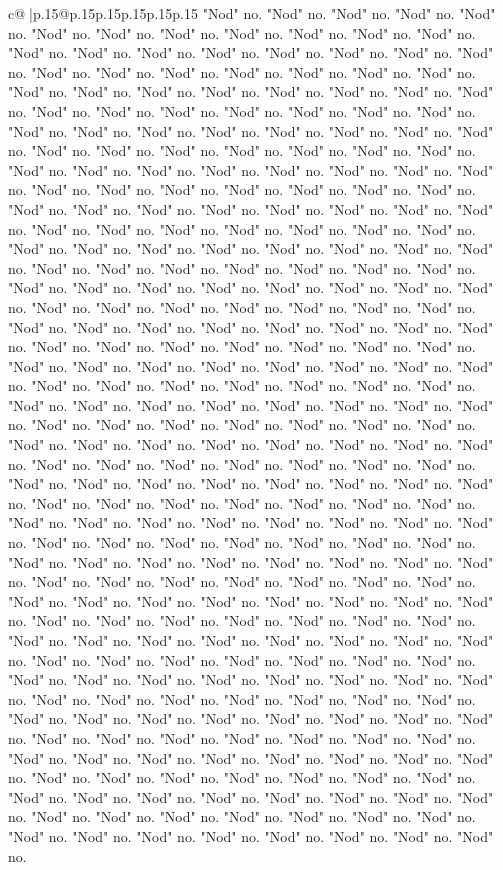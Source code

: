 \documentclass{article}
\begin{document}
{\begin{supertabular}{c@{$\;$}|p{.15\linewidth}@{}p{.15\linewidth}p{.15\linewidth}p{.15\linewidth}p{.15\linewidth}p{.15\linewidth}}
{{{"Nod" no. "Nod" no. "Nod" no. "Nod" no. "Nod" no. "Nod" no. "Nod" no. "Nod" no. "Nod" no. "Nod" no. "Nod" no. "Nod" no. "Nod" no. "Nod" no. "Nod" no. "Nod" no. "Nod" no. "Nod" no. "Nod" no. "Nod" no. "Nod" no. "Nod" no. "Nod" no. "Nod" no. "Nod" no. "Nod" no. "Nod" no. "Nod" no. "Nod" no. "Nod" no. "Nod" no. "Nod" no. "Nod" no. "Nod" no. "Nod" no. "Nod" no. "Nod" no. "Nod" no. "Nod" no. "Nod" no. "Nod" no. "Nod" no. "Nod" no. "Nod" no. "Nod" no. "Nod" no. "Nod" no. "Nod" no. "Nod" no. "Nod" no. "Nod" no. "Nod" no. "Nod" no. "Nod" no. "Nod" no. "Nod" no. "Nod" no. "Nod" no. "Nod" no. "Nod" no. "Nod" no. "Nod" no. "Nod" no. "Nod" no. "Nod" no. "Nod" no. "Nod" no. "Nod" no. "Nod" no. "Nod" no. "Nod" no. "Nod" no. "Nod" no. "Nod" no. "Nod" no. "Nod" no. "Nod" no. "Nod" no. "Nod" no. "Nod" no. "Nod" no. "Nod" no. "Nod" no. "Nod" no. "Nod" no. "Nod" no. "Nod" no. "Nod" no. "Nod" no. "Nod" no. "Nod" no. "Nod" no. "Nod" no. "Nod" no. "Nod" no. "Nod" no. "Nod" no. "Nod" no. "Nod" no. "Nod" no. "Nod" no. "Nod" no. "Nod" no. "Nod" no. "Nod" no. "Nod" no. "Nod" no. "Nod" no. "Nod" no. "Nod" no. "Nod" no. "Nod" no. "Nod" no. "Nod" no. "Nod" no. "Nod" no. "Nod" no. "Nod" no. "Nod" no. "Nod" no. "Nod" no. "Nod" no. "Nod" no. "Nod" no. "Nod" no. "Nod" no. "Nod" no. "Nod" no. "Nod" no. "Nod" no. "Nod" no. "Nod" no. "Nod" no. "Nod" no. "Nod" no. "Nod" no. "Nod" no. "Nod" no. "Nod" no. "Nod" no. "Nod" no. "Nod" no. "Nod" no. "Nod" no. "Nod" no. "Nod" no. "Nod" no. "Nod" no. "Nod" no. "Nod" no. "Nod" no. "Nod" no. "Nod" no. "Nod" no. "Nod" no. "Nod" no. "Nod" no. "Nod" no. "Nod" no. "Nod" no. "Nod" no. "Nod" no. "Nod" no. "Nod" no. "Nod" no. "Nod" no. "Nod" no. "Nod" no. "Nod" no. "Nod" no. "Nod" no. "Nod" no. "Nod" no. "Nod" no. "Nod" no. "Nod" no. "Nod" no. "Nod" no. "Nod" no. "Nod" no. "Nod" no. "Nod" no. "Nod" no. "Nod" no. "Nod" no. "Nod" no. "Nod" no. "Nod" no. "Nod" no. "Nod" no. "Nod" no. "Nod" no. "Nod" no. "Nod" no. "Nod" no. "Nod" no. "Nod" no. "Nod" no. "Nod" no. "Nod" no. "Nod" no. "Nod" no. "Nod" no. "Nod" no. "Nod" no. "Nod" no. "Nod" no. "Nod" no. "Nod" no. "Nod" no. "Nod" no. "Nod" no. "Nod" no. "Nod" no. "Nod" no. "Nod" no. "Nod" no. "Nod" no. "Nod" no. "Nod" no. "Nod" no. "Nod" no. "Nod" no. "Nod" no. "Nod" no. "Nod" no. "Nod" no. "Nod" no. "Nod" no. "Nod" no. "Nod" no. "Nod" no. "Nod" no. "Nod" no. "Nod" no. "Nod" no. "Nod" no. "Nod" no. "Nod" no. "Nod" no. "Nod" no. "Nod" no. "Nod" no. "Nod" no. "Nod" no. "Nod" no. "Nod" no. "Nod" no. "Nod" no. "Nod" no. "Nod" no. "Nod" no. "Nod" no. "Nod" no. "Nod" no. "Nod" no. "Nod" no. "Nod" no. "Nod" no. "Nod" no. "Nod" no. "Nod" no. "Nod" no. "Nod" no. "Nod" no. "Nod" no. "Nod" no. "Nod" no. "Nod" no. "Nod" no. "Nod" no. "Nod" no. "Nod" no. "Nod" no. "Nod" no. "Nod" no. "Nod" no. "Nod" no. "Nod" no. "Nod" no. "Nod" no. "Nod" no. "Nod" no. "Nod" no. "Nod" no. "Nod" no. "Nod" no. "Nod" no. "Nod" no. "Nod" no. "Nod" no. "Nod" no. "Nod" no. "Nod" no. "Nod" no. "Nod" no. "Nod" no. "Nod" no. "Nod" no. "Nod" no. "Nod" no. "Nod" no. "Nod" no. "Nod" no. "Nod" no. "Nod" no. "Nod" no. "Nod" no. "Nod" no. "Nod" no. "Nod" no. "Nod" no. "Nod" no. "Nod" no. "Nod" no. "Nod" no. "Nod" no. "Nod" no. "Nod" no. "Nod" no. }}}
\end{supertabular}}
\end{document}
